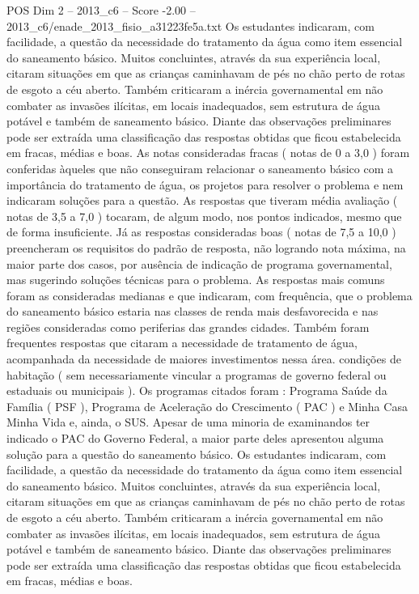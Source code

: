 \begin{textsample}{POS Dim 2 – 2013\_c6 – Score -2.00 – 2013\_c6/enade\_2013\_fisio\_a31223fe5a.txt}
Os estudantes indicaram, com facilidade, a questão da necessidade do tratamento da água como item essencial do saneamento básico.
Muitos concluintes, através da sua experiência local, citaram situações em que as crianças caminhavam de pés no chão perto de rotas de esgoto a céu aberto.
Também criticaram a inércia governamental em não combater as invasões ilícitas, em locais inadequados, sem estrutura de água potável e também de saneamento básico.
Diante das observações preliminares pode ser extraída uma classificação das respostas obtidas que ficou estabelecida em fracas, médias e boas.
As notas consideradas fracas ( notas de 0 a 3,0 ) foram conferidas àqueles que não conseguiram relacionar o saneamento básico com a importância do tratamento de água, os projetos para resolver o problema e nem indicaram soluções para a questão.
As respostas que tiveram média avaliação ( notas de 3,5 a 7,0 ) tocaram, de algum modo, nos pontos indicados, mesmo que de forma insuficiente.
Já as respostas consideradas boas ( notas de 7,5 a 10,0 ) preencheram os requisitos do padrão de resposta, não logrando nota máxima, na maior parte dos casos, por ausência de indicação de programa governamental, mas sugerindo soluções técnicas para o problema.
As respostas mais comuns foram as consideradas medianas e que indicaram, com frequência, que o problema do saneamento básico estaria nas classes de renda mais desfavorecida e nas regiões consideradas como periferias das grandes cidades.
Também foram frequentes respostas que citaram a necessidade de tratamento de água, acompanhada da necessidade de maiores investimentos nessa área. condições de habitação ( sem necessariamente vincular a programas de governo federal ou estaduais ou municipais ).
Os programas citados foram : Programa Saúde da Família ( PSF ), Programa de Aceleração do Crescimento ( PAC ) e Minha Casa Minha Vida e, ainda, o SUS.
Apesar de uma minoria de examinandos ter indicado o PAC do Governo Federal, a maior parte deles apresentou alguma solução para a questão do saneamento básico.
Os estudantes indicaram, com facilidade, a questão da necessidade do tratamento da água como item essencial do saneamento básico.
Muitos concluintes, através da sua experiência local, citaram situações em que as crianças caminhavam de pés no chão perto de rotas de esgoto a céu aberto.
Também criticaram a inércia governamental em não combater as invasões ilícitas, em locais inadequados, sem estrutura de água potável e também de saneamento básico.
Diante das observações preliminares pode ser extraída uma classificação das respostas obtidas que ficou estabelecida em fracas, médias e boas.

\end{textsample}
